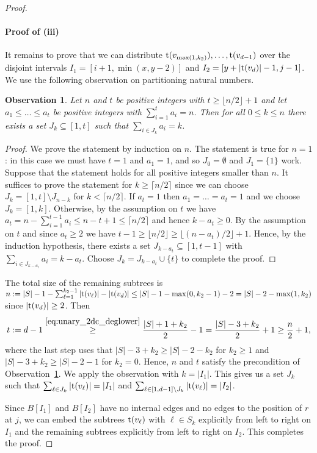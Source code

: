 \documentclass[11pt,a4paper,colorlinks=true,urlcolor=blue,citecolor=red]{article}
\theoremstyle{plain}
\newtheorem{observation}[theorem]{Observation}
\newcommand{\subsubparagraph}[1]{\paragraph{#1}}
\begin{document}
\begin{proof}
  \subsubparagraph{Proof of (iii)} It remains to prove that we can
  distribute $\mathrm t(v_{\max(1,k_2)}),\dots,\mathrm t(v_{d-1})$ over the disjoint
  intervals $I_1=[i+1,\min(x,y-2)]$ and $I_2=[y+|\mathrm t(v_d)|-1,j-1]$. We
  use the following observation on partitioning natural numbers.
\begin{observation}
    \label{obs:unary_2dc_partition}
    Let $n$ and $t$ be positive integers with $t\geq \lfloor
    n/2\rfloor+1$ and let $a_1\leq\dots\leq a_t$ be positive integers
    with $\sum_{i=1}^t a_i=n$. Then for all $0\leq k\leq n$ there exists
    a set $J_k\subseteq [1,t]$ such that $\sum_{i\in J_k} a_i=k$.
  \end{observation}
  \begin{proof}
    We prove the statement by induction on $n$. The statement is true
    for $n=1$: in this case we must have $t=1$ and $a_1=1$, and so
    $J_0=\emptyset$ and $J_1=\{1\}$ work. Suppose that the statement
    holds for all positive integers smaller than $n$. It suffices to
    prove the statement for $k\geq \lceil n/2 \rceil$ since we can
    choose $J_k=[1,t]\setminus J_{n-k}$ for $k<\lceil n/2 \rceil$. If
    $a_t=1$ then $a_1=\dots=a_t=1$ and we choose $J_k=[1,k]$. Otherwise,
    by the assumption on $t$ we have $a_t=n-\sum_{i=1}^{t-1}a_i\leq
    n-t+1\leq \lceil n/2 \rceil$ and hence $k-a_t\geq 0$.
By the assumption on $t$ and since $a_t\geq 2$ we have $t-1\geq
    \lfloor n/2 \rfloor\geq \lfloor (n-a_t)/2\rfloor +1$. Hence, by the
    induction hypothesis, there exists a set $J_{k-a_t}\subseteq
    [1,t-1]$ with $\sum_{i\in J_{k-a_t}}a_i= k-a_t$. Choose
    $J_k=J_{k-a_t}\cup\{t\}$ to complete the proof.
  \end{proof}
The total size of the remaining subtrees is
  $n:=|S|-1-\sum_{\ell=1}^{k_2-1}|\mathrm t(v_\ell)|-|\mathrm t(v_d)|\leq
  |S|-1-\max(0,k_2-1)-2=|S|-2-\max(1,k_2)$ since $|\mathrm t(v_d)|\geq 2$.
  Then
\[t:=d-1\overset{\eqref{eq:unary_2dc_deglower}}{\geq}
  \frac{|S|+1+k_2}{2}-1= \frac{|S|-3+k_2}{2}+1\geq \frac{n}{2}+1,\]
where the last step uses that $|S|-3+k_2\geq |S|-2-k_2$ for $k_2\geq
  1$ and $|S|-3+k_2\geq |S|-2-1$ for $k_2=0$.
Hence, $n$ and $t$ satisfy the precondition of
  Observation~\ref{obs:unary_2dc_partition}. We apply the observation
  with $k=|I_1|$. This gives us a set $J_k$ such that $\sum_{\ell\in J_k}
  |\mathrm t(v_\ell)|=|I_1|$ and $\sum_{\ell\in [1,d-1]\setminus J_k} |\mathrm t(v_\ell)|=|I_2|$.

  Since $B[I_1]$ and $B[I_2]$ have no internal edges and no edges to the
  position of $r$ at $j$, we can embed the subtrees $\mathrm t(v_\ell)$ with
  $\ell\in S_k$ explicitly from left to right on $I_1$ and the remaining
  subtrees explicitly from left to right on $I_2$. This completes the
  proof.
\end{proof}
\end{document}

